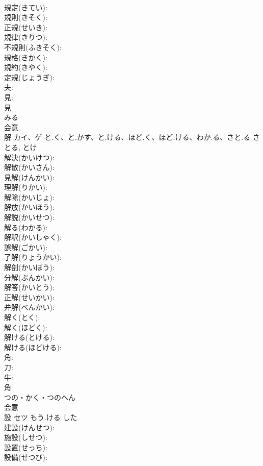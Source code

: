 \documentclass[8pt]{extreport}
\begin{document}
\begin{CJK}{UTF8}{min}
\\	規定(きてい): 
\\	規則(きそく): 
\\	正規(せいき): 
\\	規律(きりつ): 
\\	不規則(ふきそく): 
\\	規格(きかく): 
\\	規約(きやく): 
\\	定規(じょうぎ): 
\\	夫: 
\\	見: 
\\	見	
\\	みる	
\\	会意 
\\	解	カイ、ゲ	と.く、と.かす、と.ける、ほど.く、ほど.ける、わか.る、さと.る	さとる, とけ	
\\	解決(かいけつ): 
\\	解散(かいさん): 
\\	見解(けんかい): 
\\	理解(りかい): 
\\	解除(かいじょ): 
\\	解放(かいほう): 
\\	解説(かいせつ): 
\\	解る(わかる): 
\\	解釈(かいしゃく): 
\\	誤解(ごかい): 
\\	了解(りょうかい): 
\\	解剖(かいぼう): 
\\	分解(ぶんかい): 
\\	解答(かいとう): 
\\	正解(せいかい): 
\\	弁解(べんかい): 
\\	解く(とく): 
\\	解く(ほどく): 
\\	解ける(とける): 
\\	解ける(ほどける): 
\\	角: 
\\	刀: 
\\	牛: 
\\	角	
\\	つの・かく・つのへん	
\\	会意 
\\	設	セツ	もう.ける	した	
\\	建設(けんせつ): 
\\	施設(しせつ): 
\\	設置(せっち): 
\\	設備(せつび): 

\end{CJK}
\end{document}
